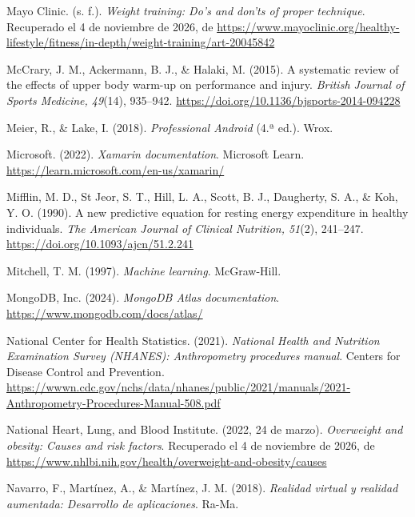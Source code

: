 \begin{referenciasapa}
\item Mayo Clinic. (s. f.). \textit{Weight training: Do's and don'ts of proper technique}. Recuperado el 4 de noviembre de 2026, de \url{https://www.mayoclinic.org/healthy-lifestyle/fitness/in-depth/weight-training/art-20045842}

\item McCrary, J. M., Ackermann, B. J., \& Halaki, M. (2015). A systematic review of the effects of upper body warm-up on performance and injury. \textit{British Journal of Sports Medicine, 49}(14), 935--942. \url{https://doi.org/10.1136/bjsports-2014-094228}

\item Meier, R., \& Lake, I. (2018). \textit{Professional Android} (4.ª ed.). Wrox.

\item Microsoft. (2022). \textit{Xamarin documentation}. Microsoft Learn. \url{https://learn.microsoft.com/en-us/xamarin/}

\item Mifflin, M. D., St Jeor, S. T., Hill, L. A., Scott, B. J., Daugherty, S. A., \& Koh, Y. O. (1990). A new predictive equation for resting energy expenditure in healthy individuals. \textit{The American Journal of Clinical Nutrition, 51}(2), 241--247. \url{https://doi.org/10.1093/ajcn/51.2.241}

\item Mitchell, T. M. (1997). \textit{Machine learning}. McGraw-Hill.

\item MongoDB, Inc. (2024). \textit{MongoDB Atlas documentation}. \url{https://www.mongodb.com/docs/atlas/}

\item National Center for Health Statistics. (2021). \textit{National Health and Nutrition Examination Survey (NHANES): Anthropometry procedures manual}. Centers for Disease Control and Prevention. \url{https://wwwn.cdc.gov/nchs/data/nhanes/public/2021/manuals/2021-Anthropometry-Procedures-Manual-508.pdf}

\item National Heart, Lung, and Blood Institute. (2022, 24 de marzo). \textit{Overweight and obesity: Causes and risk factors}. Recuperado el 4 de noviembre de 2026, de \url{https://www.nhlbi.nih.gov/health/overweight-and-obesity/causes}

\item Navarro, F., Martínez, A., \& Martínez, J. M. (2018). \textit{Realidad virtual y realidad aumentada: Desarrollo de aplicaciones}. Ra-Ma.


\end{referenciasapa}
